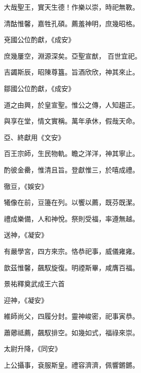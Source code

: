 \begin{pinyinscope}
 大哉聖王，實天生德！作樂以崇，時祀無斁。



 清酤惟馨，嘉牲孔碩。薦羞神明，庶幾昭格。



 兗國公位酌獻，《成安》



 庶幾屢空，淵源深矣。亞聖宣猷，
 百世宜祀。



 吉蠲斯辰，昭陳尊簋。旨酒欣欣，神其來止。



 鄒國公位酌獻，《成安》



 道之由興，於皇宣聖。惟公之傳，人知趨正。



 與享在堂，情文實稱。萬年承休，假哉天命。



 亞、終獻用《文安》



 百王宗師，生民物軌。瞻之洋洋，神其寧止。



 酌彼金罍，惟清且旨。登獻惟三，於嘻成禮。



 徹豆，《娛安》



 犧像在前，豆籩在列。以饗以薦，既芬既潔。



 禮成樂備，人和神悅。祭則受福，率遵無越。



 送神，《凝安》



 有嚴學宮，四方來宗。恪恭祀事，威儀雍雍。



 歆茲惟馨，飆馭旋復。明禋斯畢，咸膺百福。



 景祐釋奠武成王六首



 迎神，《凝安》



 維師尚父，四履分封。靈神峻密，祀事寅恭。



 蕭薌祗薦，飆馭排空。如幾如式，福祿來崇。



 太尉升降，《同安》



 上公攝事，袞服斯皇。禮容濟濟，佩響鏘鏘。




\end{pinyinscope}
